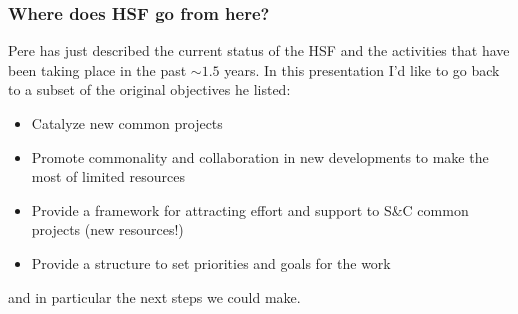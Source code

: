 \begin{frame}
 \frametitle{Where does HSF go from here?}
 Pere has just described the current status of the HSF and the activities that have been taking place in the past $\sim1.5$ years. In this presentation I'd like to go back to a subset of the original objectives he listed:

\begin{itemize}
\item Catalyze new common projects
\item Promote commonality and collaboration in new developments to make the most of limited resources
\item Provide a framework for attracting effort and support to S\&C common projects (new resources!)
\item Provide a structure to set priorities and goals for the work
\end{itemize}

and in particular the next steps we could make. 

\end{frame}


